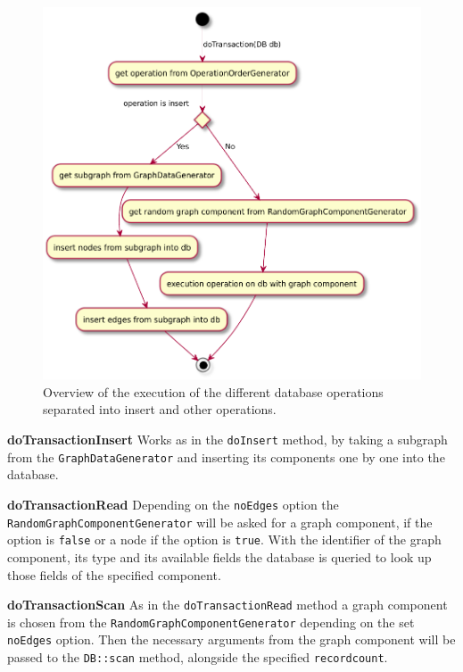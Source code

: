 \begin{figure}[h!]
  \includegraphics[width=\textwidth]{images/extensions/graphWorkloadExecution}
  \caption{Overview of the execution of the different database operations separated into insert and other operations.}
  \label{fig:graphWorkloadExecution}
\end{figure}

\textbf{doTransactionInsert} \newline
Works as in the \texttt{doInsert} method,
by taking a subgraph from the \texttt{GraphDataGenerator} and inserting its components one by one into the database.

\textbf{doTransactionRead} \newline
Depending on the \texttt{noEdges} option the \texttt{RandomGraphComponentGenerator} will be asked for a graph component,
if the option is \texttt{false} or a node if the option is \texttt{true}.
With the identifier of the graph component,
its type and its available fields the database is queried to look up those fields of the specified component.

\textbf{doTransactionScan} \newline
As in the \texttt{doTransactionRead} method a graph component is chosen from the \texttt{RandomGraphComponentGenerator} depending on the set \texttt{noEdges} option.
Then the necessary arguments from the graph component will be passed to the \texttt{DB::scan} method,
alongside the specified \texttt{recordcount}.

